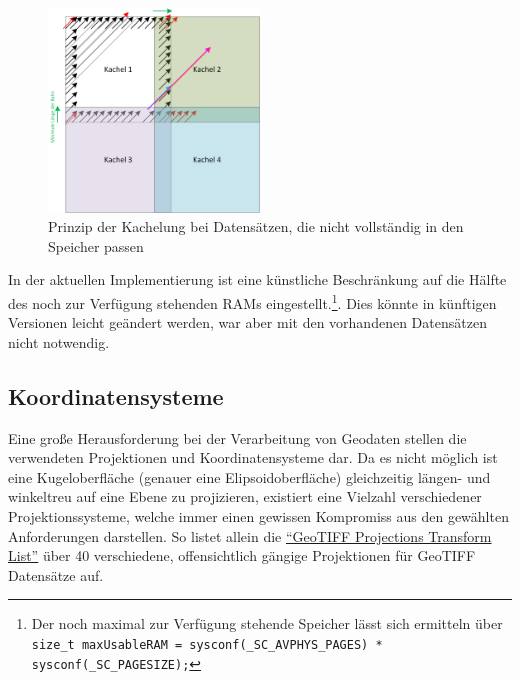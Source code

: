 \documentclass[10pt,a4paper]{report}
\begin{document}
\begin{figure}[ht]
\centering
	\includegraphics[width=0.5\textwidth]{../Vorgehensweise/drawings/UeberlappungKacheln.png}
	\caption{Prinzip der Kachelung bei Datensätzen, die nicht vollständig in den Speicher passen}
	\label{kachelung}
\end{figure}


In der aktuellen Implementierung ist eine künstliche Beschränkung auf die Hälfte des noch zur Verfügung stehenden RAMs eingestellt.\footnote{Der noch maximal zur Verfügung stehende Speicher lässt sich ermitteln über \texttt{size\_t maxUsableRAM = sysconf(\_SC\_AVPHYS\_PAGES) * sysconf(\_SC\_PAGESIZE);}}. Dies könnte in künftigen Versionen leicht geändert werden, war aber mit den vorhandenen Datensätzen nicht notwendig.

\subsection{Koordinatensysteme}

Eine große Herausforderung bei der Verarbeitung von Geodaten stellen die verwendeten Projektionen und Koordinatensysteme dar. Da es nicht möglich ist eine Kugeloberfläche (genauer eine Elipsoidoberfläche) gleichzeitig längen- und winkeltreu auf eine Ebene zu projizieren, existiert eine Vielzahl verschiedener Projektionssysteme, welche immer einen gewissen Kompromiss aus den gewählten Anforderungen darstellen. So listet allein die \href{http://geotiff.maptools.org/proj_list/}{"`GeoTIFF Projections Transform List"'} über 40 verschiedene, offensichtlich gängige Projektionen für GeoTIFF Datensätze auf.
\end{document}
